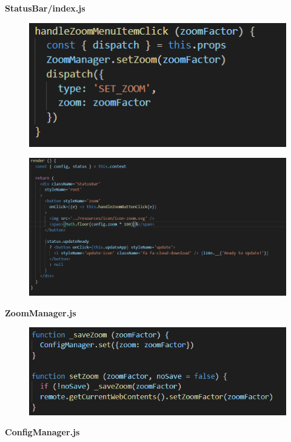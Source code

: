 \documentclass[main.tex]{subfiles}
\begin{document}
\textbf{StatusBar/index.js}

\begin{figure}[h]
\includegraphics[scale=0.7]{images/handlerZoom.png}
\centering
\end{figure}

\begin{figure}[h]
\includegraphics[scale=0.4]{images/render.png}
\centering
\end{figure}
\clearpage

\textbf{ZoomManager.js}

\begin{figure}[h]
\includegraphics[scale=0.7]{images/zoomManager.png}
\centering
\end{figure}

\textbf{ConfigManager.js}
\end{document}
